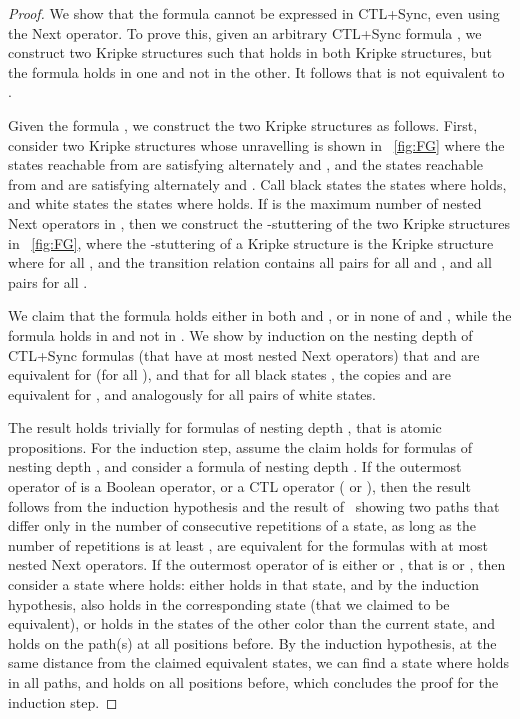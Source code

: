 \documentclass{article}
\begin{document}
\begin{proof}
We show that the formula  cannot be expressed in CTL+Sync, even using
the Next operator. To prove this, given an arbitrary CTL+Sync formula ,
we construct two Kripke structures such that  holds in both Kripke structures,
but the formula  holds in one and not in the other. It follows that 
 is not equivalent to .



Given the formula , we construct the two Kripke structures as follows.
First, consider two Kripke structures whose unravelling is shown in \figurename~\ref{fig:FG}
where the states reachable from  are satisfying alternately  and ,
and the states reachable from  and  are satisfying alternately  and .
Call black states the states where  holds, and white states the states where  holds.
If  is the maximum number of nested Next operators in , 
then we construct the -stuttering of the two Kripke structures in \figurename~\ref{fig:FG},
where the -stuttering of a Kripke structure 
is the Kripke structure  
where  for all , and 
the transition relation  contains
all pairs  for all  and ,
and all pairs  for all .

We claim that the formula  holds either in both  and ,
or in none of  and , while the formula  holds in  and not in .
We show by induction on the nesting depth of CTL+Sync formulas  (that
have at most  nested Next operators)
that  and  are equivalent for  (for all ),
and that for all black states , the copies  and  are equivalent for ,
and analogously for all pairs of white states.

The result holds trivially for formulas of nesting depth , that is atomic propositions.
For the induction step, assume the claim holds for formulas of nesting depth ,
and consider a formula  of nesting depth . If the outermost operator
of  is a Boolean operator, or a CTL operator ( or ), 
then the result follows from the induction hypothesis and the result of~\cite[Theorem~2]{KS05}
showing two paths that differ only in the number of consecutive repetitions of a state,
as long as the number of repetitions is at least , are equivalent for the formulas 
with at most  nested Next operators.
If the outermost operator of  is either  or , that is
 or ,
then consider a state where  holds: either  holds in that state,
and by the induction hypothesis,  also holds in the corresponding state (that we
claimed to be equivalent),
or  holds in the states of the other color than the current state, 
and  holds on the path(s) at all positions before. By the induction 
hypothesis, at the same distance from the claimed equivalent states, 
we can find a state where  holds in all paths, and  holds on all positions before,
which concludes the proof for the induction step.
\end{proof}
\end{document}
